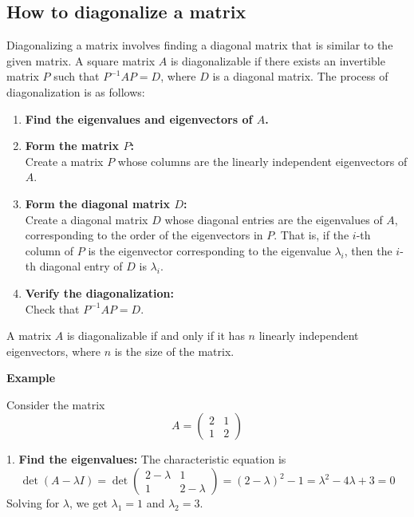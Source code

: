 \subsection{How to diagonalize a matrix}

Diagonalizing a matrix involves finding a diagonal matrix that is similar to the given matrix. A square matrix \(A\) is diagonalizable if there exists an invertible matrix \(P\) such that \(P^{-1}AP = D\), where \(D\) is a diagonal matrix.
The process of diagonalization is as follows:

\begin{enumerate}
    \item \textbf{Find the eigenvalues and eigenvectors of \(A\).}
    
    \item \textbf{Form the matrix \(P\):} \\
    Create a matrix \(P\) whose columns are the linearly independent eigenvectors of \(A\).
    
    \item \textbf{Form the diagonal matrix \(D\):} \\
    Create a diagonal matrix \(D\) whose diagonal entries are the eigenvalues of \(A\), corresponding to the order of the eigenvectors in \(P\). That is, if the \(i\)-th column of \(P\) is the eigenvector corresponding to the eigenvalue \(\lambda_i\), then the \(i\)-th diagonal entry of \(D\) is \(\lambda_i\).
    
    \item \textbf{Verify the diagonalization:} \\
    Check that \(P^{-1}AP = D\).
\end{enumerate}
  
A matrix \(A\) is diagonalizable if and only if it has \(n\) linearly independent eigenvectors, where \(n\) is the size of the matrix.

\textbf{Example}

Consider the matrix
\[
A = \begin{pmatrix}
2 & 1 \\
1 & 2
\end{pmatrix}
\]

1.  \textbf{Find the eigenvalues:}
    The characteristic equation is
    \[
    \det(A - \lambda I) = \det \begin{pmatrix}
    2 - \lambda & 1 \\
    1 & 2 - \lambda
    \end{pmatrix} = (2 - \lambda)^2 - 1 = \lambda^2 - 4\lambda + 3 = 0
    \]
    Solving for \(\lambda\), we get \(\lambda_1 = 1\) and \(\lambda_2 = 3\).

